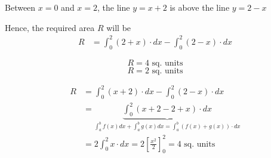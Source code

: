 \documentclass[14pt,fleqn]{extarticle}
\begin{document}
\begin{question}
\begin{step}
\begin{options}
    \end{options} 
     \reason 
     
     Between $x=0$ and $x=2$, the line $y = x+2$ is above the line $y = 2-x$\newline 
     
     Hence, the required area $R$ will be
     \begin{align}
	R &= \int_0^2 \left(2+x \right)\cdot dx - \int_0^2 \left(2-x \right)\cdot dx 
\end{align}
       
\end{step}

\begin{step}
  \begin{options} 
     \correct 
       \[ R = 4\text{ sq. units} \]
     \incorrect
        \[ R = 2\text{ sq. units} \]
    \end{options} 
     \reason 
     
     \begin{align}
	R &= \int_0^2 \left(x+2 \right)\cdot dx - \int_0^2 \left(2-x \right)\cdot dx\\
	&= \underbrace{\int_0^2 \left(x+2 - 2 + x \right)\cdot dx }_{\int_a^b f(x) dx + \int_a^b g(x)dx = \int_a^b \left(f(x) + g(x) \right)\cdot dx} \\
	&= 2 \int_0^2 x\cdot dx = 2 \left[\frac{x^2}{2} \right]_0^2 = 4\text{ sq. units}
\end{align}
       
\end{step}
\end{question} 
\end{document}
